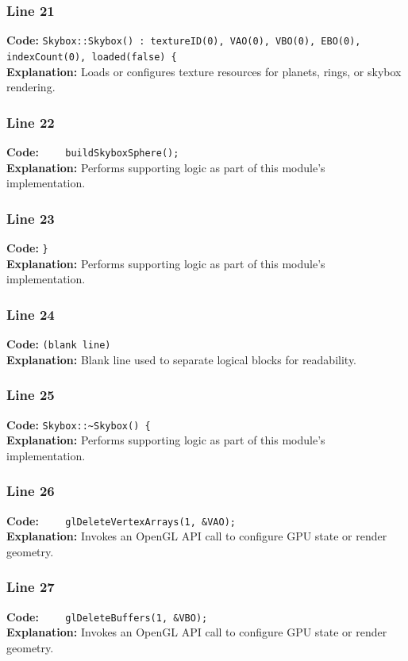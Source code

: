 \documentclass[11pt,a4paper]{article}
\begin{document}
\subsubsection*{Line 21}
\textbf{Code:} \verb|Skybox::Skybox() : textureID(0), VAO(0), VBO(0), EBO(0), indexCount(0), loaded(false) {|\\
\textbf{Explanation:} Loads or configures texture resources for planets, rings, or skybox rendering.

\subsubsection*{Line 22}
\textbf{Code:} \verb|    buildSkyboxSphere();|\\
\textbf{Explanation:} Performs supporting logic as part of this module's implementation.

\subsubsection*{Line 23}
\textbf{Code:} \verb|}|\\
\textbf{Explanation:} Performs supporting logic as part of this module's implementation.

\subsubsection*{Line 24}
\textbf{Code:} \texttt{(blank line)}\\
\textbf{Explanation:} Blank line used to separate logical blocks for readability.

\subsubsection*{Line 25}
\textbf{Code:} \verb|Skybox::~Skybox() {|\\
\textbf{Explanation:} Performs supporting logic as part of this module's implementation.

\subsubsection*{Line 26}
\textbf{Code:} \verb|    glDeleteVertexArrays(1, &VAO);|\\
\textbf{Explanation:} Invokes an OpenGL API call to configure GPU state or render geometry.

\subsubsection*{Line 27}
\textbf{Code:} \verb|    glDeleteBuffers(1, &VBO);|\\
\textbf{Explanation:} Invokes an OpenGL API call to configure GPU state or render geometry.
\end{document}
